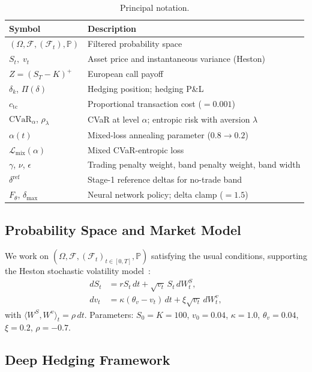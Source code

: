 \documentclass[11pt]{article}
\newcommand{\F}{\mathcal{F}}
\newcommand{\PP}{\mathbb{P}}
\newcommand{\cvar}{\mathrm{CVaR}}
\begin{document}
\begin{table}[h]
\centering
\caption{Principal notation.}
\label{tab:nomenclature}
\small
\begin{tabularx}{\textwidth}{@{}lX@{}}
\toprule
\textbf{Symbol} & \textbf{Description} \\
\midrule
$(\Omega,\F,(\F_t),\PP)$ & Filtered probability space \\
$S_t,\;v_t$ & Asset price and instantaneous variance (Heston) \\
$Z = (S_T-K)^+$ & European call payoff \\
$\delta_k$, $\Pi(\delta)$ & Hedging position; hedging P\&L \\
$c_{\mathrm{tc}}$ & Proportional transaction cost ($=0.001$) \\
$\cvar_\alpha$, $\rho_\lambda$ & CVaR at level $\alpha$; entropic risk with aversion $\lambda$ \\
$\alpha(t)$ & Mixed-loss annealing parameter ($0.8 \to 0.2$) \\
$\mathcal{L}_{\mathrm{mix}}(\alpha)$ & Mixed CVaR-entropic loss \\
$\gamma$, $\nu$, $\epsilon$ & Trading penalty weight, band penalty weight, band width \\
$\delta^{\mathrm{ref}}$ & Stage-1 reference deltas for no-trade band \\
$F_\theta$, $\delta_{\max}$ & Neural network policy; delta clamp ($=1.5$) \\
\bottomrule
\end{tabularx}
\end{table}

\subsection{Probability Space and Market Model}

We work on $(\Omega, \F, (\F_t)_{t\in[0,T]}, \PP)$ satisfying the usual conditions, supporting the Heston stochastic volatility model~\citep{heston1993closed}:
\begin{align}
    dS_t &= rS_t\,dt + \sqrt{v_t}\,S_t\,dW^S_t, \label{eq:heston_s}\\
    dv_t &= \kappa(\theta_v - v_t)\,dt + \xi\sqrt{v_t}\,dW^v_t, \label{eq:heston_v}
\end{align}
with $\langle W^S,W^v\rangle_t = \rho\,dt$. Parameters: $S_0=K=100$, $v_0=0.04$, $\kappa=1.0$, $\theta_v=0.04$, $\xi=0.2$, $\rho=-0.7$.

\subsection{Deep Hedging Framework}
\end{document}
